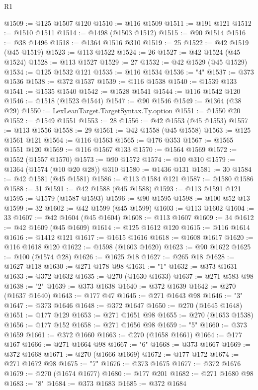 \begin{lexlean}{R1}
\begin{coremodule}
@1509 := @125 @1507 @120
@1510 := @116 @1509
@1511 := @191 @121
@1512 := @1510 @1511
@1514 := @1498 (@1503 @1512)
@1515 := @90 @1514
@1516 := @38 @1496
@1518 := @1364 @1516 @310
@1519 := 25
@1522 := @42 @1519 (@45 @1519)
@1523 := @113 @1522
@1524 := 26
@1527 := @42 @1524 (@45 @1524)
@1528 := @113 @1527
@1529 := 27
@1532 := @42 @1529 (@45 @1529)
@1534 := @125 @1532 @121
@1535 := @116 @1534
@1536 := "4"
@1537 := @373 @1536
@1538 := @372 @1537
@1539 := @116 @1538
@1540 := @1539 @133
@1541 := @1535 @1540
@1542 := @1528 @1541
@1544 := @116 @1542 @120
@1546 := @1518 (@1523 @1544)
@1547 := @90 @1546
@1549 := @1364 (@38 @29)
@1550 := LexLeanTarget.TargetSyntax.Ty.option
@1551 := @1550 @20
@1552 := @1549 @1551
@1553 := 28
@1556 := @42 @1553 (@45 @1553)
@1557 := @113 @1556
@1558 := 29
@1561 := @42 @1558 (@45 @1558)
@1563 := @125 @1561 @121
@1564 := @116 @1563
@1565 := @176 @353
@1567 := @1565 @1551 @120
@1569 := @116 @1567 @133
@1570 := @1564 @1569
@1572 := @1552 (@1557 @1570)
@1573 := @90 @1572
@1574 := @10 @310
@1579 := @1364 (@1574 (@10 @20 @28)) @310
@1580 := @1436 @131
@1581 := 30
@1584 := @42 @1581 (@45 @1581)
@1586 := @113 @1584 @121
@1587 := @1580 @1586
@1588 := 31
@1591 := @42 @1588 (@45 @1588)
@1593 := @113 @1591 @121
@1595 := @1579 (@1587 @1593)
@1596 := @90 @1595
@1598 := @100 @52 @13
@1599 := 32
@1602 := @42 @1599 (@45 @1599)
@1603 := @113 @1602
@1604 := 33
@1607 := @42 @1604 (@45 @1604)
@1608 := @113 @1607
@1609 := 34
@1612 := @42 @1609 (@45 @1609)
@1614 := @125 @1612 @120
@1615 := @116 @1614
@1616 := @1412 @121
@1617 := @1615 @1616
@1618 := @1608 @1617
@1620 := @116 @1618 @120
@1622 := @1598 (@1603 @1620)
@1623 := @90 @1622
@1625 := @100 (@1574 @28)
@1626 := @1625 @18
@1627 := @265 @18
@1628 := @1627 @118
@1630 := @271 @178 @98
@1631 := "1"
@1632 := @373 @1631
@1633 := @372 @1632
@1635 := @270 (@1630 @1633)
@1637 := @271 @583 @98
@1638 := "2"
@1639 := @373 @1638
@1640 := @372 @1639
@1642 := @270 (@1637 @1640)
@1643 := @177 @47
@1645 := @271 @1643 @98
@1646 := "3"
@1647 := @373 @1646
@1648 := @372 @1647
@1650 := @270 (@1645 @1648)
@1651 := @177 @129
@1653 := @271 @1651 @98
@1655 := @270 (@1653 @1538)
@1656 := @177 @152
@1658 := @271 @1656 @98
@1659 := "5"
@1660 := @373 @1659
@1661 := @372 @1660
@1663 := @270 (@1658 @1661)
@1664 := @177 @167
@1666 := @271 @1664 @98
@1667 := "6"
@1668 := @373 @1667
@1669 := @372 @1668
@1671 := @270 (@1666 @1669)
@1672 := @177 @172
@1674 := @271 @1672 @98
@1675 := "7"
@1676 := @373 @1675
@1677 := @372 @1676
@1679 := @270 (@1674 @1677)
@1680 := @177 @201
@1682 := @271 @1680 @98
@1683 := "8"
@1684 := @373 @1683
@1685 := @372 @1684

\end{coremodule}
\end{lexlean}
